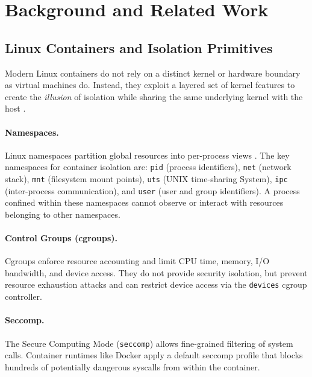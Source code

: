 \section{Background and Related Work}
\label{sec:background}


\subsection{Linux Containers and Isolation Primitives}
\label{subsec:containers}

Modern Linux containers do not rely on a distinct kernel or hardware boundary as virtual machines do. Instead, they exploit a layered set of kernel features to create the \textit{illusion} of isolation while sharing the same underlying kernel with the host \cite{sultan2019container}.

\paragraph{Namespaces.} Linux namespaces partition global resources into per-process views \cite{linux_namespaces_manpage}. The key namespaces for container isolation are: \texttt{pid} (process identifiers), \texttt{net} (network stack), \texttt{mnt} (filesystem mount points), \texttt{uts} (UNIX time-sharing System), \texttt{ipc} (inter-process communication), and \texttt{user} (user and group identifiers). A process confined within these namespaces cannot observe or interact with resources belonging to other namespaces.

\paragraph{Control Groups (cgroups).} Cgroups enforce resource accounting and limit CPU time, memory, I/O bandwidth, and device access. They do not provide security isolation, but prevent resource exhaustion attacks and can restrict device access via the \texttt{devices} cgroup controller.

\paragraph{Seccomp.} The Secure Computing Mode (\texttt{seccomp}) allows fine-grained filtering of system calls. Container runtimes like Docker apply a default seccomp profile that blocks hundreds of potentially dangerous syscalls from within the container.

